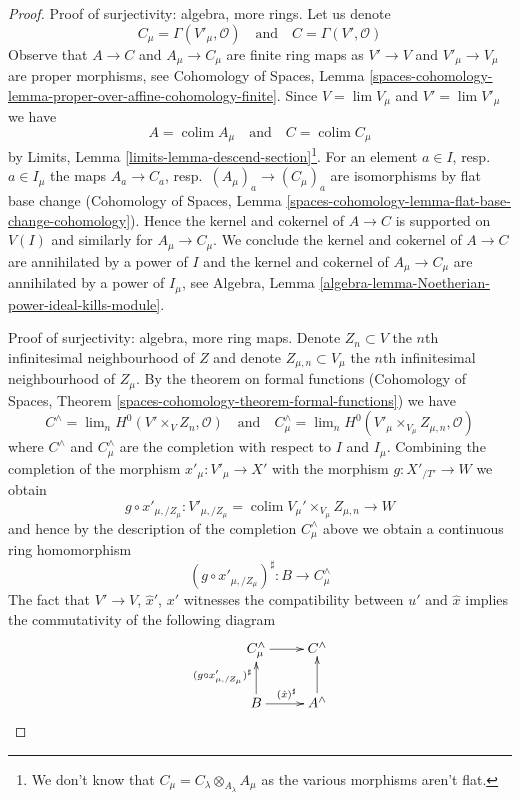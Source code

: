 \documentclass{stacks-project}
\theoremstyle{plain}
\theoremstyle{definition}
\theoremstyle{remark}
\numberwithin{equation}{subsection}
\def\lim{\mathop{\mathrm{lim}}\nolimits}
\def\colim{\mathop{\mathrm{colim}}\nolimits}
\begin{document}
\begin{proof}
\medskip\noindent
Proof of surjectivity: algebra, more rings.
Let us denote
$$
C_\mu = \Gamma(V'_\mu, \mathcal{O})
\quad\text{and}\quad
C = \Gamma(V', \mathcal{O})
$$
Observe that $A \to C$ and $A_\mu \to C_\mu$ are finite ring maps as
$V' \to V$ and $V'_\mu \to V_\mu$ are proper morphisms, see
Cohomology of Spaces, Lemma
\ref{spaces-cohomology-lemma-proper-over-affine-cohomology-finite}.
Since $V = \lim V_\mu$ and $V' = \lim V'_\mu$
we have
$$
A = \colim A_\mu
\quad\text{and}\quad
C = \colim C_\mu
$$
by Limits, Lemma \ref{limits-lemma-descend-section}\footnote{We don't
know that $C_\mu = C_\lambda \otimes_{A_\lambda} A_\mu$ as the
various morphisms aren't flat.}. For an element
$a \in I$, resp.\ $a \in I_\mu$ the maps $A_a \to C_a$,
resp.\ $(A_\mu)_a \to (C_\mu)_a$ are isomorphisms by flat base change
(Cohomology of Spaces, Lemma
\ref{spaces-cohomology-lemma-flat-base-change-cohomology}).
Hence the kernel and cokernel of $A \to C$ is supported
on $V(I)$ and similarly for $A_\mu \to C_\mu$.
We conclude the kernel and cokernel of $A \to C$
are annihilated by a power of $I$ and the kernel and cokernel of
$A_\mu \to C_\mu$ are annihilated by a power of $I_\mu$, see
Algebra, Lemma \ref{algebra-lemma-Noetherian-power-ideal-kills-module}.

\medskip\noindent
Proof of surjectivity: algebra, more ring maps.
Denote $Z_n \subset V$ the $n$th infinitesimal
neighbourhood of $Z$ and denote $Z_{\mu, n} \subset V_\mu$
the $n$th infinitesimal neighbourhood of $Z_\mu$.
By the theorem on formal functions
(Cohomology of Spaces, Theorem
\ref{spaces-cohomology-theorem-formal-functions})
we have
$$
C^\wedge = \lim_n H^0(V' \times_V Z_n, \mathcal{O})
\quad\text{and}\quad
C_\mu^\wedge =
\lim_n H^0(V'_\mu \times_{V_\mu} Z_{\mu, n}, \mathcal{O})
$$
where $C^\wedge$ and $C_\mu^\wedge$ are the completion with
respect to $I$ and $I_\mu$.
Combining the completion of the morphism
$x'_\mu : V'_\mu \to X'$ with the morphism $g : X'_{/T'} \to W$ we obtain
$$
g \circ x'_{\mu, /Z_\mu} :
V'_{\mu, /Z_\mu} = \colim V_\mu' \times_{V_\mu} Z_{\mu, n}
\longrightarrow
W
$$
and hence by the description of the completion
$C_\mu^\wedge$ above we obtain a continuous ring homomorphism
$$
(g \circ x'_{\mu, /Z_\mu})^\sharp : B \longrightarrow C_\mu^\wedge
$$
The fact that $V' \to V$, $\hat x'$, $x'$ witnesses the compatibility
between $u'$ and $\hat x$ implies the
commutativity of the following diagram
$$
\xymatrix{
C_\mu^\wedge \ar[r] &
C^\wedge \\
B \ar[u]^{(g \circ x'_{\mu, /Z_\mu})^\sharp} \ar[r]^{(\hat x)^\sharp} &
A^\wedge \ar[u]
}
$$


\end{proof}
\end{document}
